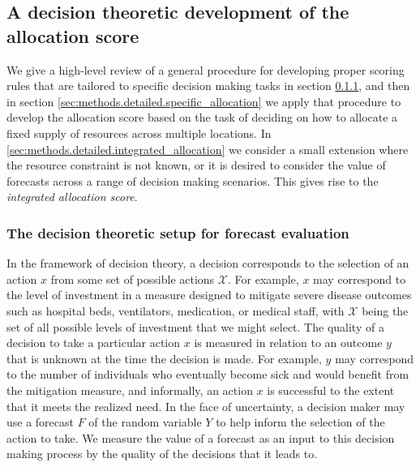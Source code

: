 \documentclass{article}\usepackage[]{graphicx}\usepackage[]{xcolor}
\begin{document}
\subsection{A decision theoretic development of the allocation score}
\label{sec:methods.detailed}

We give a high-level review of a general procedure for developing proper scoring rules that are tailored to specific decision making tasks in section \ref{sec:methods.detailed.decisiontheory}, and then in section \ref{sec:methods.detailed.specific_allocation} we apply that procedure to develop the allocation score based on the task of deciding on how to allocate a fixed supply of resources across multiple locations. In \ref{sec:methods.detailed.integrated_allocation} we consider a small extension where the resource constraint is not known, or it is desired to consider the value of forecasts across a range of decision making scenarios. This gives rise to the \emph{integrated allocation score}.

\subsubsection{The decision theoretic setup for forecast evaluation}
\label{sec:methods.detailed.decisiontheory}


In the framework of decision theory, a decision corresponds to the selection of an action $x$ from some set of possible actions $\mathcal{X}$. For example, $x$ may correspond to the level of investment in a measure designed to mitigate severe disease outcomes such as hospital beds, ventilators, medication, or medical staff, with $\mathcal{X}$ being the set of all possible levels of investment that we might select. The quality of a decision to take a particular action $x$ is measured in relation to an outcome $y$ that is unknown at the time the decision is made. For example, $y$ may correspond to the number of individuals who eventually become sick and would benefit from the mitigation measure, and informally, an action $x$ is successful to the extent that it meets the realized need. In the face of uncertainty, a decision maker may use a forecast $F$ of the random variable $Y$ to help inform the selection of the action to take. We measure the value of a forecast as an input to this decision making process by the quality of the decisions that it leads to.
\end{document}
